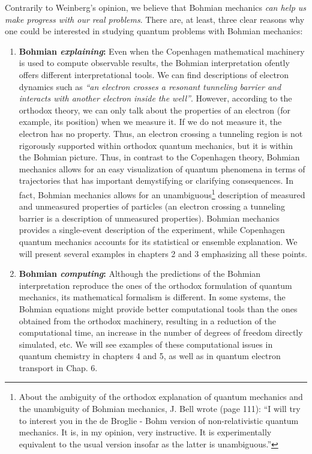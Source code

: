 \documentclass[nofootinbib, secnumarabic, amsmath, nobibnotes,10pt,aps,pra]{revtex4-1}
\begin{document}
Contrarily to Weinberg's opinion, we believe that Bohmian mechanics \emph{can help us make progress with our real problems}. There are, at least, three clear reasons why one could be interested in studying quantum problems with Bohmian mechanics:
\begin{enumerate}
\item \textbf{Bohmian \emph{explaining}:} Even when the Copenhagen mathematical machinery is used to compute observable results, the Bohmian interpretation ofently offers different interpretational tools. We can find descriptions of electron dynamics such as \emph{``an electron crosses a resonant tunneling barrier and interacts with another electron inside the well''}. However, according to the orthodox theory, we can only talk about the properties of an electron (for example, its position) when we measure it. If we do not measure it, the electron has no property. Thus, an electron crossing a tunneling region is not rigorously supported within orthodox quantum mechanics, but it is within the Bohmian picture.
Thus, in contrast to the Copenhagen theory, Bohmian mechanics allows for an easy visualization of quantum phenomena in terms of trajectories that has important demystifying or clarifying consequences. In fact, Bohmian mechanics allows for an unambiguous\footnote{About the ambiguity of the orthodox explanation of quantum mechanics and the unambiguity of Bohmian mechanics, J. Bell wrote\cite{om.Bell1987} (page 111): ``I will try to interest you in the de Broglie - Bohm version of non-relativistic quantum mechanics. It is, in my opinion, very instructive. It is experimentally equivalent to the usual version insofar as the latter is unambiguous.''} description of measured and unmeasured properties of particles (an electron crossing a tunneling barrier is a description of unmeasured properties). Bohmian mechanics provides a single-event description of the experiment, while Copenhagen quantum mechanics accounts for its statistical or ensemble explanation. We will present several examples in chapters 2 and 3 emphasizing all these points. \\

\item \textbf{Bohmian \emph{computing}:} Although the predictions of the Bohmian interpretation reproduce the ones of the orthodox formulation of quantum mechanics, its mathematical formalism is different. In some systems, the Bohmian equations might provide better computational tools than the ones obtained from the orthodox machinery, resulting in a reduction of the computational time, an increase in the number of degrees of freedom directly simulated, etc.  We will see examples of these computational issues in quantum chemistry in chapters 4 and 5, as well as in quantum electron transport in Chap. 6.\\



\end{enumerate}
\end{document}

